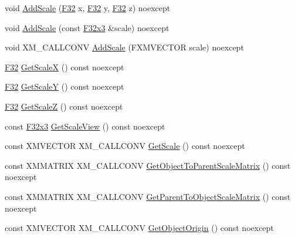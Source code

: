 \begin{DoxyCompactItemize}
\item 
void \mbox{\hyperlink{classmage_1_1_s_e_t_transform3_d_a62829e4d91334749c9f4ddca244379b4}{Add\+Scale}} (\mbox{\hyperlink{namespacemage_aa97e833b45f06d60a0a9c4fc22ae02c0}{F32}} x, \mbox{\hyperlink{namespacemage_aa97e833b45f06d60a0a9c4fc22ae02c0}{F32}} y, \mbox{\hyperlink{namespacemage_aa97e833b45f06d60a0a9c4fc22ae02c0}{F32}} z) noexcept
\item 
void \mbox{\hyperlink{classmage_1_1_s_e_t_transform3_d_a961f125cecb4ea16d2ee0c4693d749e7}{Add\+Scale}} (const \mbox{\hyperlink{namespacemage_a1e3c7a882af461f161caa1cbddaf1fa2}{F32x3}} \&scale) noexcept
\item 
void X\+M\+\_\+\+C\+A\+L\+L\+C\+O\+NV \mbox{\hyperlink{classmage_1_1_s_e_t_transform3_d_acc532311cd2ec5b15aa3fca8c5daa699}{Add\+Scale}} (F\+X\+M\+V\+E\+C\+T\+OR scale) noexcept
\item 
\mbox{\hyperlink{namespacemage_aa97e833b45f06d60a0a9c4fc22ae02c0}{F32}} \mbox{\hyperlink{classmage_1_1_s_e_t_transform3_d_ad7d2448b6c03628b412a7effbc26945d}{Get\+ScaleX}} () const noexcept
\item 
\mbox{\hyperlink{namespacemage_aa97e833b45f06d60a0a9c4fc22ae02c0}{F32}} \mbox{\hyperlink{classmage_1_1_s_e_t_transform3_d_a9192f398e72756d40b0352df43b9b4f1}{Get\+ScaleY}} () const noexcept
\item 
\mbox{\hyperlink{namespacemage_aa97e833b45f06d60a0a9c4fc22ae02c0}{F32}} \mbox{\hyperlink{classmage_1_1_s_e_t_transform3_d_acfe8a172bc51d80cac209a5892a677d3}{Get\+ScaleZ}} () const noexcept
\item 
const \mbox{\hyperlink{namespacemage_a1e3c7a882af461f161caa1cbddaf1fa2}{F32x3}} \mbox{\hyperlink{classmage_1_1_s_e_t_transform3_d_a48bf69795eb946ffdcf28991c7a74537}{Get\+Scale\+View}} () const noexcept
\item 
const X\+M\+V\+E\+C\+T\+OR X\+M\+\_\+\+C\+A\+L\+L\+C\+O\+NV \mbox{\hyperlink{classmage_1_1_s_e_t_transform3_d_a305163d41378fe39b2b7bdbf6e698ffe}{Get\+Scale}} () const noexcept
\item 
const X\+M\+M\+A\+T\+R\+IX X\+M\+\_\+\+C\+A\+L\+L\+C\+O\+NV \mbox{\hyperlink{classmage_1_1_s_e_t_transform3_d_aecfdd58a18d02727916a50718223eda1}{Get\+Object\+To\+Parent\+Scale\+Matrix}} () const noexcept
\item 
const X\+M\+M\+A\+T\+R\+IX X\+M\+\_\+\+C\+A\+L\+L\+C\+O\+NV \mbox{\hyperlink{classmage_1_1_s_e_t_transform3_d_a6def4f05bd7c381759fd2737fcfc5e4a}{Get\+Parent\+To\+Object\+Scale\+Matrix}} () const noexcept
\item 
const X\+M\+V\+E\+C\+T\+OR X\+M\+\_\+\+C\+A\+L\+L\+C\+O\+NV \mbox{\hyperlink{classmage_1_1_s_e_t_transform3_d_a5ece58ae7ebd189139cac5888283341b}{Get\+Object\+Origin}} () const noexcept

\end{DoxyCompactItemize}
